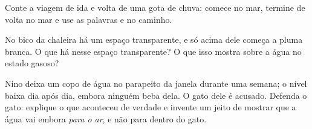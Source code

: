 \begin{exercise}[$\star$]\label{exo:g2:ice-water-steam:8}
Conte a viagem de ida e volta de uma gota de chuva: comece no mar,
termine de volta no mar e use as palavras  e  no
caminho.
\end{exercise}

\begin{exercise}[$\star\star$]\label{exo:g2:ice-water-steam:9}
No bico da chaleira há um espaço transparente, e só acima dele
começa a pluma branca. O que há nesse espaço transparente? O que isso
mostra sobre a água no estado gasoso?
\end{exercise}

\begin{exercise}[$\star\star$]\label{exo:g2:ice-water-steam:10}
Nino deixa um copo de água no parapeito da janela durante uma semana;
o nível baixa dia após dia, embora ninguém beba dela. O gato dele é
acusado. Defenda o gato: explique o que aconteceu de verdade e
invente um jeito de mostrar que a água vai embora \emph{para o ar}, e
não para dentro do gato.
\end{exercise}
